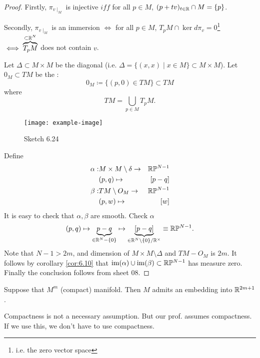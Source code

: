 \begin{proof}
    Firstly, \(\pi_{v\mid_M}\) is injective \(iff\) for all 
    \(p\in M\), \((p+tv)_{t\in\mathbb{R}}\cap M = \{p\}\). 
    
    Secondly,
    \(\pi_{v\mid_M}\) is an immersion \(\iff\) for all \(p\in M\), \(T_pM\cap \ker d\pi_v=0\)\footnote{i.e. the zero vector space}
    \(\iff \overbrace{T_pM}^{\subset\mathbb{R}^N}\) does not contain \(v\).

    Let \(\Delta\subset M\times M\) be the diagonal (i.e. \(\Delta=\{(x,x)\mid x\in M\}\subset M\times M\)). Let 
    \(0_M\subset TM\) be the : 
    \[0_M\coloneqq \{(p,0)\in TM\}\subset TM\]
    where \[TM=\bigcup_{p\in M} T_p M.\]
    \begin{figure}[H]\label{fig:6.24}
        \centering
        \texttt{[image: example-image]}
        \caption{Sketch 6.24}
    \end{figure}
    Define \begin{align*} %
        \alpha:& M\times M \setminus \delta \to & \R\bP^{N-1}\\
        &(p,q)\mapsto& [p-q]\\
        \beta:& TM\setminus O_M\to& \R\bP^{N-1}\\
        &(p,w)\mapsto &[w]
    \end{align*}
    It is easy to check that \(\alpha,\beta\) are smooth. Check \(\alpha\)
    \begin{align*}
        (p,q)\mapsto \underbrace{p-q}_{\in\mathbb{R}^{N}-\{0\}}\mapsto \underbrace{[p-q]}_{\in\mathbb{R}^N\setminus \{0\}/\mathbb{R}^\times}\equiv \mathbb{R}\mathbb{P}^{N-1}.
    \end{align*}
    Note that \(N-1>2m\), and dimension of \(M\times M\setminus\Delta\) and \(TM-O_M\) is \(2m\).
    It follows by corollary \ref{cor:6.10} that \(\text{im}(\alpha)\cup\text{im}(\beta)\subset \mathbb{R} \mathbb{P}^{N-1}\) has measure zero.
    Finally the conclusion follows from sheet 08.
\end{proof}

\begin{corollary}\label{cor:6.12:strong_whitney}
    Suppose that \(M^m\) (compact) manifold. Then \(M\) admits an embedding into \(\mathbb{R}^{2m+1}\).
\end{corollary}

\begin{remark}
    Compactness is not a necessary assumption. But our prof. assumes compactness. If we use this, we don't have to use compactness.
\end{remark}

